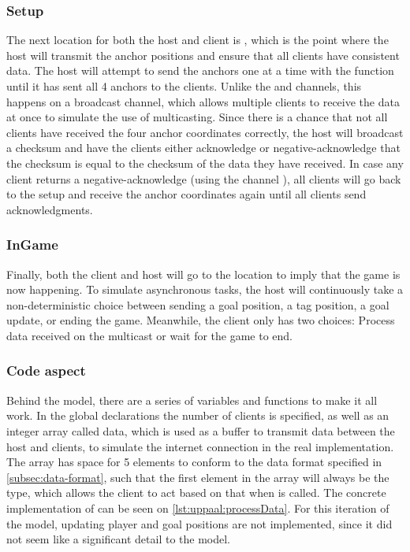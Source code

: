 \subsubsection{Setup}
The next location for both the host and client is , which is the point where the host will transmit the anchor positions and ensure that all clients have consistent data.
The host will attempt to send the anchors one at a time with the  function until it has sent all 4 anchors to the clients.
Unlike the  and  channels, this happens on a broadcast channel, which allows multiple clients to receive the data at once to simulate the use of multicasting.
Since there is a chance that not all clients have received the four anchor coordinates correctly, the host will broadcast a checksum and have the clients either acknowledge or negative-acknowledge that the checksum is equal to the checksum of the data they have received.
In case any client returns a negative-acknowledge (using the channel ), all clients will go back to the setup and receive the anchor coordinates again until all clients send acknowledgments.

\subsubsection{InGame}
Finally, both the client and host will go to the  location to imply that the game is now happening.
To simulate asynchronous tasks, the host will continuously take a non-deterministic choice between sending a goal position, a tag position, a goal update, or ending the game.
Meanwhile, the client only has two choices: Process data received on the multicast or wait for the game to end.

\subsubsection{Code aspect}
Behind the model, there are a series of variables and functions to make it all work.
In the global declarations the number of clients is specified, as well as an integer array called data, which is used as a buffer to transmit data between the host and clients, to simulate the internet connection in the real implementation.
The array has space for 5 elements to conform to the data format specified in \autoref{subsec:data-format}, such that the first element in the array will always be the type, which allows the client to act based on that when  is called.
The concrete implementation of  can be seen on \autoref{lst:uppaal:processData}.
For this iteration of the \uppaal model, updating player and goal positions are not implemented, since it did not seem like a significant detail to the model.

